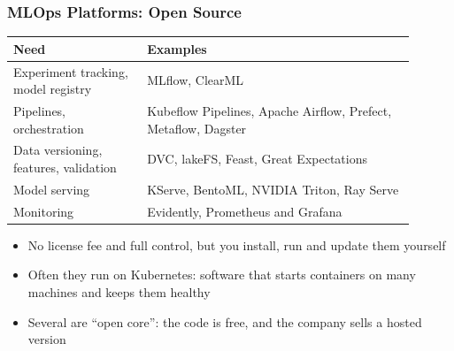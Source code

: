 \begin{frame}[fragile]\frametitle{MLOps Platforms: Open Source}
\begin{center}
\small\renewcommand{\arraystretch}{1.35}
\begin{tabular}{>{\raggedright\arraybackslash}p{0.3\linewidth}>{\raggedright\arraybackslash}p{0.6\linewidth}}
\hline
\textbf{Need} & \textbf{Examples} \\
\hline
Experiment tracking, model registry & MLflow, ClearML \\
Pipelines, orchestration & Kubeflow Pipelines, Apache Airflow, Prefect, Metaflow, Dagster \\
Data versioning, features, validation & DVC, lakeFS, Feast, Great Expectations \\
Model serving & KServe, BentoML, NVIDIA Triton, Ray Serve \\
Monitoring & Evidently, Prometheus and Grafana \\
\hline
\end{tabular}
\end{center}
\begin{itemize}
\item No license fee and full control, but you install, run and update them yourself
\item Often they run on Kubernetes: software that starts containers on many machines and keeps them healthy
\item Several are ``open core'': the code is free, and the company sells a hosted version
\end{itemize}
\end{frame}

